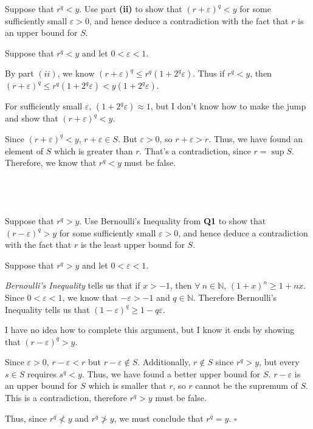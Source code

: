 \documentclass[a4paper]{article}
\begin{document}
\begin{questionbody}
Suppose that $r^q < y$. Use part \textbf{(ii)} to show that ${(r + \varepsilon)}^q < y$ for some sufficiently small $\varepsilon > 0$, and hence deduce a contradiction with the fact that $r$ is an upper bound for $S$.
\end{questionbody}

Suppose that $r^q < y$ and let $0 < \varepsilon < 1$.

By part $(ii)$, we know ${(r + \varepsilon)}^q \le r^q (1 + 2^q \varepsilon)$. Thus if $r^q < y$, then ${(r + \varepsilon)}^q \le r^q (1 + 2^q \varepsilon) < y (1 + 2^q \varepsilon)$.

For sufficiently small $\varepsilon$, $(1 + 2^q \varepsilon) \approx 1$, but I don't know how to make the jump and show that ${(r + \varepsilon)}^q < y$.

Since ${(r + \varepsilon)}^q < y$, $r + \varepsilon \in S$. But $\varepsilon > 0$, so $r + \varepsilon > r$. Thus, we have found an element of $S$ which is greater than $r$. That's a contradiction, since $r = \sup S$. Therefore, we know that $r^q < y$ must be false.

\subsection{~} %

\begin{questionbody}
Suppose that $r^q > y$. Use Bernoulli’s Inequality from \textbf{Q1} to show that ${(r - \varepsilon)}^q > y$ for some sufficiently small $\varepsilon > 0$, and hence deduce a contradiction with the fact that $r$ is the least upper bound for $S$.
\end{questionbody}

Suppose that $r^q > y$ and let $0 < \varepsilon < 1$.

\textit{Bernoulli's Inequality} tells us that if $x > -1$, then $\forall\ n \in \mathbb N$, ${(1 + x)}^n \ge 1 + nx$. Since $0 < \varepsilon < 1$, we know that $-\varepsilon > -1$ and $q \in \mathbb N$. Therefore Bernoulli's Inequality tells us that ${(1 - \varepsilon)}^q \ge 1 - q\varepsilon$.

I have no idea how to complete this argument, but I know it ends by showing that ${(r - \varepsilon)}^q > y$.

Since $\varepsilon > 0$, $r - \varepsilon < r$ but $r - \varepsilon \notin S$. Additionally, $r \notin S$ since $r^q > y$, but every $s \in S$ requires $s^q < y$. Thus, we have found a better upper bound for $S$. $r - \varepsilon$ is an upper bound for $S$ which is smaller that $r$, so $r$ cannot be the supremum of $S$. This is a contradiction, therefore $r^q > y$ must be false.

Thus, since $r^q \not < y$ and $r^q \not > y$, we must conclude that $r^q = y$. \hfill $\square$
\end{document}
